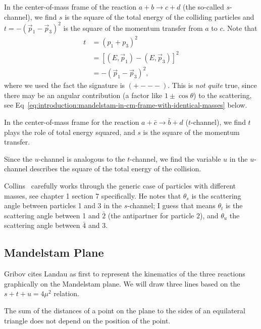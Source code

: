  In the center-of-mass frame of the reaction $a+b\to c+d$
(the so-called $s$-channel), we find $s$ is the square of the total
energy of the colliding particles and $t=-(\vec{p}_{1}-\vec{p}_{3})^{2}$
is the square of the momentum transfer from $a$ to $c$. Note that
\begin{subequations}
  \begin{align}
    t &= (p_{1} + p_{3})^{2}\\
    &= [(E,\vec{p}_{1}) - (E,\vec{p}_{3})]^{2}\\
    &= -(\vec{p}_{1}-\vec{p}_{3})^{2},
  \end{align}
\end{subequations}
where we used the fact the signature is $(+---)$. This is \emph{not quite}
true, since there may be an angular contribution (a factor like
$1\pm\cos\theta$) to the scattering, see Eq~\eqref{eq:introduction:mandelstam-in-cm-frame-with-identical-masses}
below.

In the center-of-mass frame for the reaction $a+\bar{c}\to\bar{b}+d$
($t$-channel), we find $t$ plays the role of total energy squared, and
$s$ is the square of the momentum transfer.

Since the $u$-channel is analogous to the $t$-channel, we find the
variable $u$ in the $u$-channel describes the square of the total energy
of the collision.

\begin{remark}
Collins~\cite{Collins:1977jy} carefully works through the generic case
of particles with different masses, see chapter 1 section 7 specifically.
He notes that $\theta_{s}$ is the scattering angle between particles 1
and 3 in the $s$-channel; I guess that means $\theta_{t}$ is the
scattering angle between 1 and $\bar{2}$ (the antipartner for particle $2$),
and $\theta_{u}$ the scattering angle between $\bar{4}$ and $3$.
\end{remark}

\subsection{Mandelstam Plane}

\M
Gribov cites Landau as first to represent the kinematics of the three
reactions graphically on the Mandelstam plane. We will draw three lines
based on the $s+t+u=4\mu^{2}$ relation.

The sum of the distances of a point on the plane to the sides of an
equilateral triangle does not depend on the position of the point.

